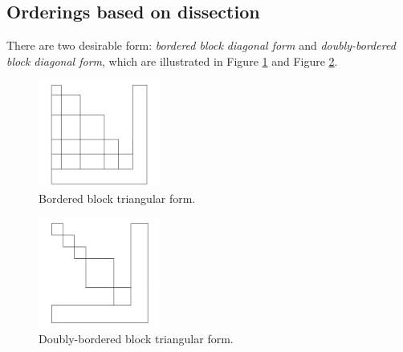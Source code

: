 \subsection{Orderings based on dissection}
\label{sec:Dissection}

\begin{defn}
  There are two desirable form: \emph{bordered block diagonal form} and
  \emph{doubly-bordered block diagonal form}, which are illustrated in Figure \ref{fig:BBTF}
  and Figure \ref{fig:DBBTF}.

  \begin{figure}[H]
    \centering
    \includegraphics[width=4cm]{png/BorderedBlockDF.png}
    \caption{Bordered block triangular form.}
    \label{fig:BBTF}
  \end{figure}
  \begin{figure}[H]
    \centering
    \includegraphics[width=4cm]{png/DBorderedBlockDF.png}
    \caption{Doubly-bordered block triangular form.}
    \label{fig:DBBTF}
  \end{figure}
  
\end{defn}
